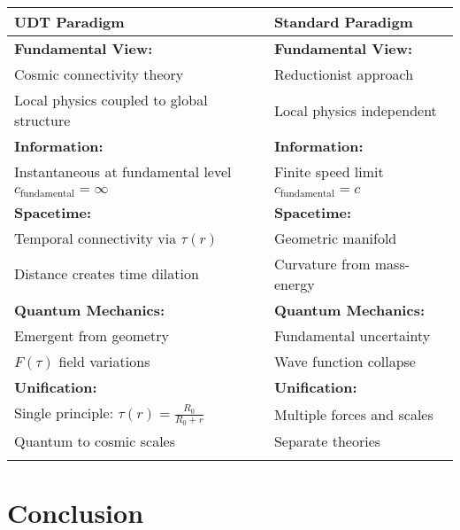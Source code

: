 \documentclass[11pt,a4paper]{article}
\begin{document}
\begin{center}
\begin{tabular}{|p{}|p{}|}
\hline
\textcolor{udtblue}{\textbf{UDT Paradigm}} & \textcolor{standardred}{\textbf{Standard Paradigm}} \\
\hline
\vspace{0.3cm}
\textbf{Fundamental View:} & \textbf{Fundamental View:} \\
Cosmic connectivity theory & Reductionist approach \\
Local physics coupled to global structure & Local physics independent \\
\vspace{0.3cm}

\textbf{Information:} & \textbf{Information:} \\
Instantaneous at fundamental level & Finite speed limit \\
$c_{\text{fundamental}} = \infty$ & $c_{\text{fundamental}} = c$ \\
\vspace{0.3cm}

\textbf{Spacetime:} & \textbf{Spacetime:} \\
Temporal connectivity via $\tau(r)$ & Geometric manifold \\
Distance creates time dilation & Curvature from mass-energy \\
\vspace{0.3cm}

\textbf{Quantum Mechanics:} & \textbf{Quantum Mechanics:} \\
Emergent from geometry & Fundamental uncertainty \\
$F(\tau)$ field variations & Wave function collapse \\
\vspace{0.3cm}

\textbf{Unification:} & \textbf{Unification:} \\
\textcolor{udtblue}{Single principle: } $\tau(r) = \frac{R_0}{R_0 + r}$ & \textcolor{standardred}{Multiple forces and scales} \\
\textcolor{udtblue}{Quantum to cosmic scales} & \textcolor{standardred}{Separate theories} \\
\vspace{0.3cm}
\hline
\end{tabular}
\end{center}

\section{Conclusion}
\end{document}
